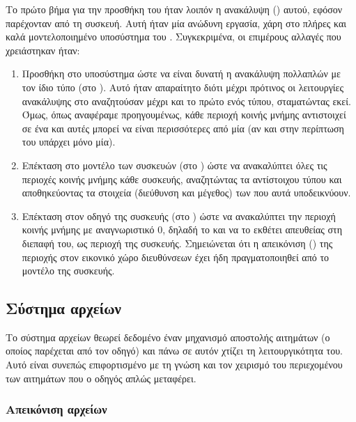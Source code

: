 Το πρώτο βήμα για την προσθήκη του  ήταν λοιπόν η ανακάλυψη
() αυτού, εφόσον παρέχονταν από τη συσκευή. Αυτή ήταν μία ανώδυνη
εργασία, χάρη στο πλήρες και καλά μοντελοποιημένο υποσύστημα  του
\osv{}. Συγκεκριμένα, οι επιμέρους αλλαγές που χρειάστηκαν ήταν:
\begin{enumerate}
    \item Προσθήκη στο  υποσύστημα ώστε να είναι δυνατή η ανακάλυψη
          πολλαπλών  με τον ίδιο τύπο (στο
          ). Αυτό ήταν απαραίτητο διότι μέχρι
          πρότινος οι λειτουργίες ανακάλυψης στο \osv{} αναζητούσαν μέχρι και το
          πρώτο  ενός τύπου, σταματώντας εκεί. Όμως, όπως
          αναφέραμε προηγουμένως, κάθε περιοχή κοινής μνήμης αντιστοιχεί σε ένα
           και αυτές μπορεί να είναι περισσότερες από μία (αν
          και στην περίπτωση του \viofs{} υπάρχει μόνο μία).
    \item Επέκταση στο μοντέλο των  συσκευών (στο    %
          ) ώστε να ανακαλύπτει όλες τις
          περιοχές κοινής μνήμης κάθε συσκευής, αναζητώντας τα 
          αντίστοιχου τύπου και αποθηκεύοντας τα στοιχεία (διεύθυνση και
          μέγεθος) των  που αυτά υποδεικνύουν.
    \item Επέκταση στον οδηγό της \viofs{} συσκευής (στο
          ) ώστε να ανακαλύπτει την περιοχή κοινής
          μνήμης με αναγνωριστικό 0, δηλαδή το  και να το εκθέτει
          απευθείας στη διεπαφή του, ως περιοχή 
          της συσκευής. Σημειώνεται ότι η απεικόνιση () της περιοχής
          στον εικονικό χώρο διευθύνσεων έχει ήδη πραγματοποιηθεί από το μοντέλο
          της συσκευής.
\end{enumerate}

\subsection{Σύστημα αρχείων}

Το \viofs{} σύστημα αρχείων θεωρεί δεδομένο έναν μηχανισμό αποστολής 
αιτημάτων (ο οποίος παρέχεται από τον οδηγό) και πάνω σε αυτόν χτίζει τη
λειτουργικότητα του. Αυτό είναι συνεπώς επιφορτισμένο με τη γνώση και τον
χειρισμό του περιεχομένου των αιτημάτων που ο οδηγός απλώς μεταφέρει.

\subsubsection{Απεικόνιση αρχείων}


